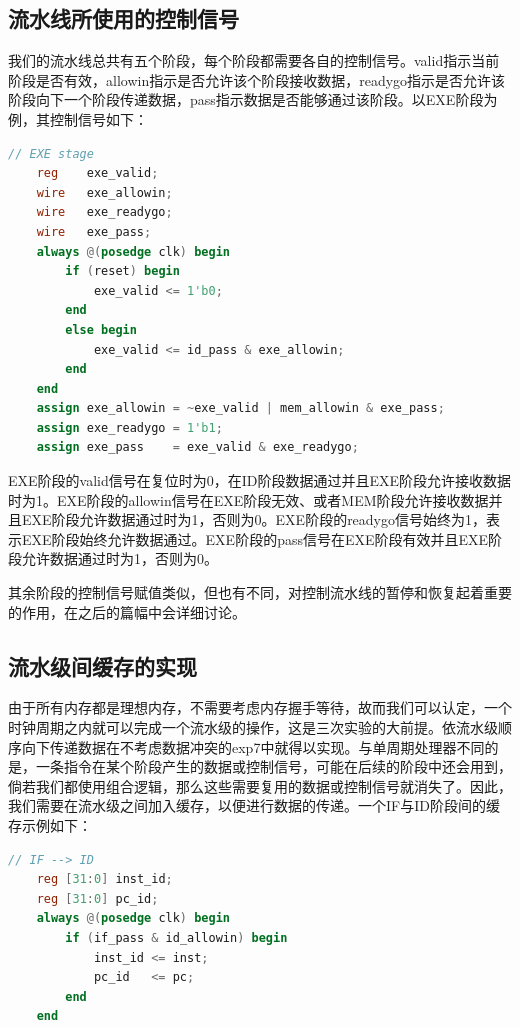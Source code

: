 \documentclass[UTF8]{report}
\begin{document}
\subsection{流水线所使用的控制信号}

我们的流水线总共有五个阶段，每个阶段都需要各自的控制信号。valid指示当前阶段是否有效，allowin指示是否允许该个阶段接收数据，readygo指示是否允许该阶段向下一个阶段传递数据，pass指示数据是否能够通过该阶段。以EXE阶段为例，其控制信号如下：

\begin{lstlisting}[language=Verilog]
    // EXE stage
    reg    exe_valid;
    wire   exe_allowin;
    wire   exe_readygo;
    wire   exe_pass;
    always @(posedge clk) begin
        if (reset) begin
            exe_valid <= 1'b0;
        end
        else begin
            exe_valid <= id_pass & exe_allowin;
        end
    end
    assign exe_allowin = ~exe_valid | mem_allowin & exe_pass;
    assign exe_readygo = 1'b1;
    assign exe_pass    = exe_valid & exe_readygo;
\end{lstlisting}

EXE阶段的valid信号在复位时为0，在ID阶段数据通过并且EXE阶段允许接收数据时为1。EXE阶段的allowin信号在EXE阶段无效、或者MEM阶段允许接收数据并且EXE阶段允许数据通过时为1，否则为0。EXE阶段的readygo信号始终为1，表示EXE阶段始终允许数据通过。EXE阶段的pass信号在EXE阶段有效并且EXE阶段允许数据通过时为1，否则为0。

其余阶段的控制信号赋值类似，但也有不同，对控制流水线的暂停和恢复起着重要的作用，在之后的篇幅中会详细讨论。


\subsection{流水级间缓存的实现}

由于所有内存都是理想内存，不需要考虑内存握手等待，故而我们可以认定，一个时钟周期之内就可以完成一个流水级的操作，这是三次实验的大前提。依流水级顺序向下传递数据在不考虑数据冲突的exp7中就得以实现。与单周期处理器不同的是，一条指令在某个阶段产生的数据或控制信号，可能在后续的阶段中还会用到，倘若我们都使用组合逻辑，那么这些需要复用的数据或控制信号就消失了。因此，我们需要在流水级之间加入缓存，以便进行数据的传递。一个IF与ID阶段间的缓存示例如下：

\begin{lstlisting}[language=Verilog]
    // IF --> ID
    reg [31:0] inst_id;
    reg [31:0] pc_id;
    always @(posedge clk) begin
        if (if_pass & id_allowin) begin
            inst_id <= inst;
            pc_id   <= pc;
        end
    end
\end{lstlisting}
\end{document}
